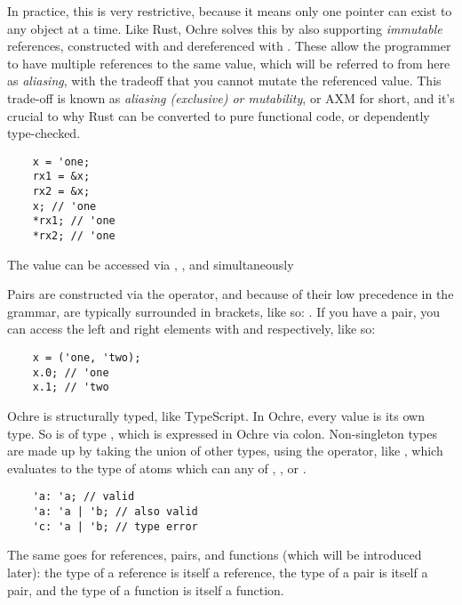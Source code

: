 \documentclass[12pt,twoside]{report}
\begin{document}
In practice, this is very restrictive, because it means only one pointer can exist to any object at a time. Like Rust, Ochre solves this by also supporting \textit{immutable} references, constructed with \mono{\&} and dereferenced with \mono{*}. These allow the programmer to have multiple references to the same value, which will be referred to from here as \textit{aliasing}, with the tradeoff that you cannot mutate the referenced value. This trade-off is known as \textit{aliasing (exclusive) or mutability}, or AXM for short, and it's crucial to why Rust can be converted to pure functional code, or dependently type-checked.

\begin{listing}[H]
  \begin{verbatim}
    x = 'one;
    rx1 = &x;
    rx2 = &x;
    x; // 'one
    *rx1; // 'one
    *rx2; // 'one
  \end{verbatim}
  \caption{The value  can be accessed via , , and  simultaneously}
  \label{lst:immref}
\end{listing}

Pairs are constructed via the \mono{,} operator, and because of their low precedence in the grammar, are typically surrounded in brackets, like so: . If you have a pair, you can access the left and right elements with  and  respectively, like so:

\begin{listing}[H]
  \begin{verbatim}
    x = ('one, 'two);
    x.0; // 'one
    x.1; // 'two
  \end{verbatim}
\end{listing}

Ochre is structurally typed, like TypeScript. In Ochre, every value is its own type. So  is of type , which is expressed in Ochre via colon. Non-singleton types are made up by taking the union of other types, using the \mono{|} operator, like , which evaluates to the type of atoms which can any of , , or .

\begin{listing}[H]
  \begin{verbatim}
    'a: 'a; // valid
    'a: 'a | 'b; // also valid
    'c: 'a | 'b; // type error
  \end{verbatim}
\end{listing}

The same goes for references, pairs, and functions (which will be introduced later): the type of a reference is itself a reference, the type of a pair is itself a pair, and the type of a function is itself a function.
\end{document}
